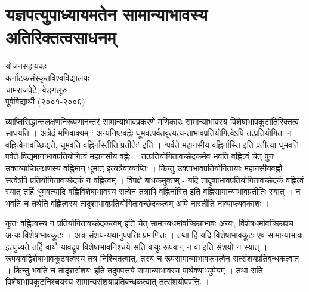 \chapter{यज्ञपत्युपाध्यायमतेन सामान्याभावस्य अतिरिक्तत्वसाधनम्}

\begin{center}
\smallskip

योजनसहायकः\\
कर्नाटकसंस्कृतविश्वविद्यालयः\\
चामराजपेटे, बेङ्गलूरु\\
पूर्वविद्यार्थी (२००१-२००६)
\addrule
\end{center}

व्याप्तिसिद्धान्तलक्षणनिरूपणानन्तरं सामान्याभावप्रकरणे मणिकारः  सामान्याभावस्य विशेषाभावकूटातिरिक्तत्वं साधयति । अत्रेदं मणिवाक्यम् ‘ अन्यनिष्ठवह्नेः धूमवत्पर्वतवृत्यत्यन्ताभावप्रतियोगित्वेऽपि तत्प्रतियोगिता न वह्नित्वेनावच्छिद्यते, धूमवति वह्निर्नास्तीति प्रतीतेः’ इति । ‘पर्वते महानसीय वह्निर्नास्ति इति प्रतीत्या धूमवति पर्वते विद्यमानाभावप्रतियोगित्वं महानसीय वह्नेः । तत्प्रतियोगितावच्छेदकमेव भवति वह्नित्वं चेत् पुनः उक्तव्याप्तिलक्षणस्य वह्निमान् धूमात् इत्यत्रैवाव्याप्तिः । किन्तु उक्ताभावप्रतियोगितायाः महानसीयवह्नौ सत्वेऽपि प्रतियोगितावच्छेदकं न वह्नित्वम् । विपक्षे बाधकमुक्तम् - यदि तादृशाभावप्रतियोगितावच्छेदकं वह्नित्वं स्यात् तर्हि धूमवत्यादि वह्निविशेषाभावस्य सत्वेन तत्रापि वह्निर्नास्ति इति वह्निसामान्याभावप्रतीतिः स्यात् । न भवति च तथेति वह्नित्वस्य तादृशाभावप्रतियोगितावच्छेदकत्वम् अपि नास्तीति नाव्याप्त्यवकाशः ।  

कुतः वह्नित्वस्य न प्रतियोगितावच्छेदकत्वम् इति चेत् सामान्यधर्मावच्छिन्नाभावः अन्यः, विशेषधर्मावच्छिन्नश्च अन्यः विशेषाभावकूटः । अत्र संशयन्यथानुपपत्तिः प्रमाणितः । तथा हि यदि विशेषाभावकूटः एव सामान्याभावः इत्युच्यते तर्हि वायौ यावद्रूप विशेषाभावनिश्चये सति वायुः रूपवान् न वा इति संशयो न स्यात् । रूपयावद्विशेषाभावकूटवत्वस्य तत्र निश्चितत्वात्, तस्य च रूपसामान्याभावरूपत्वेन सत्संशयप्रतिबन्धकत्वात् । किन्तु भवति च तादृशसंशयः इति तदुपपत्तये सामान्याभावस्य पार्थक्याभ्युपेयम् । तथा सति विशेषाभावकूटनिश्चयस्य सामान्यसंशयाप्रतिबन्धकत्वात् तत्संशयोपपत्तिः ।

